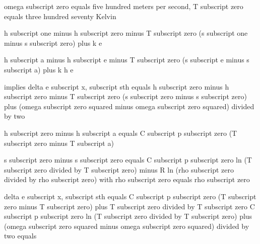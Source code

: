 omega subscript zero equals five hundred meters per second, T subscript zero equals three hundred seventy Kelvin

h subscript one minus h subscript zero minus T subscript zero (s subscript one minus s subscript zero) plus k e

h subscript a minus h subscript e minus T subscript zero (s subscript e minus s subscript a) plus k h e

implies delta e subscript x, subscript sth equals h subscript zero minus h subscript zero minus T subscript zero (s subscript zero minus s subscript zero) plus (omega subscript zero squared minus omega subscript zero squared) divided by two

h subscript zero minus h subscript a equals C subscript p subscript zero (T subscript zero minus T subscript a)

s subscript zero minus s subscript zero equals C subscript p subscript zero ln (T subscript zero divided by T subscript zero) minus R ln (rho subscript zero divided by rho subscript zero) with rho subscript zero equals rho subscript zero

delta e subscript x, subscript sth equals C subscript p subscript zero (T subscript zero minus T subscript zero) plus T subscript zero divided by T subscript zero C subscript p subscript zero ln (T subscript zero divided by T subscript zero) plus (omega subscript zero squared minus omega subscript zero squared) divided by two equals